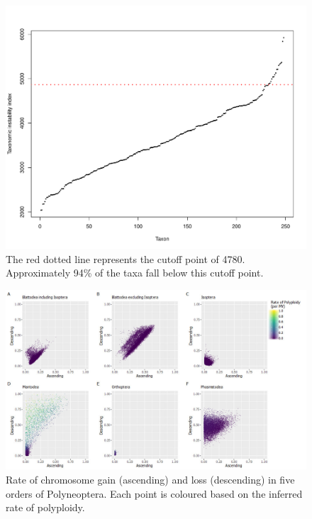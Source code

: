 \begin{figure}
\centering \includegraphics[width=.7\textwidth]{figures/taxonomic_instability_index_plot.pdf}
\caption{
The red dotted line represents the cutoff point of 4780. Approximately 94\% of the taxa fall below this cutoff point.
}
\label{fig:tax.index}
\end{figure}

\begin{figure}
\centering \includegraphics[width=1\textwidth]{figures/rate_estimates.jpg}
\caption{
Rate of chromosome gain (ascending) and loss (descending) in five orders of Polyneoptera. Each point is coloured based on the inferred rate of polyploidy.
}
\label{fig:rates}
\end{figure}

